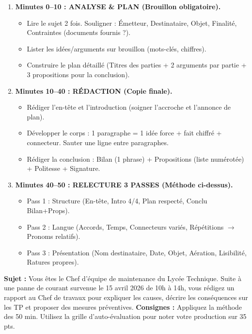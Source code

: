 \documentclass[11pt]{article}
\begin{document}
\begin{methode}
\begin{enumerate}
    \item \textbf{Minutes 0–10 : ANALYSE \& PLAN (Brouillon obligatoire).}
        \begin{itemize}
            \item Lire le sujet 2 fois. Souligner : Émetteur, Destinataire, Objet, Finalité, Contraintes (documents fournis ?).
            \item Lister les idées/arguments sur brouillon (mots-clés, chiffres).
            \item Construire le plan détaillé (Titres des parties + 2 arguments par partie + 3 propositions pour la conclusion).
        \end{itemize}
    \item \textbf{Minutes 10–40 : RÉDACTION (Copie finale).}
        \begin{itemize}
            \item Rédiger l'en-tête et l'introduction (soigner l'accroche et l'annonce de plan).
            \item Développer le corps : 1 paragraphe = 1 idée force + fait chiffré + connecteur. Sauter une ligne entre paragraphes.
            \item Rédiger la conclusion : Bilan (1 phrase) + Propositions (liste numérotée) + Politesse + Signature.
        \end{itemize}
    \item \textbf{Minutes 40–50 : RELECTURE 3 PASSES (Méthode ci-dessus).}
        \begin{itemize}
            \item Pass 1 : Structure (En-tête, Intro 4/4, Plan respecté, Conclu Bilan+Props).
            \item Pass 2 : Langue (Accords, Temps, Connecteurs variés, Répétitions $\to$ Pronoms relatifs).
            \item Pass 3 : Présentation (Nom destinataire, Date, Objet, Aération, Lisibilité, Ratures propres).
        \end{itemize}
\end{enumerate}
\end{methode}

\begin{exercice}
\textbf{Sujet :} Vous êtes le Chef d'équipe de maintenance du Lycée Technique. Suite à une panne de courant survenue le 15 avril 2026 de 10h à 14h, vous rédigez un rapport au Chef de travaux pour expliquer les causes, décrire les conséquences sur les TP et proposer des mesures préventives.
\textbf{Consignes :} Appliquez la méthode des 50 min. Utilisez la grille d'auto-évaluation pour noter votre production sur 35 pts.
\end{exercice}
\end{document}
